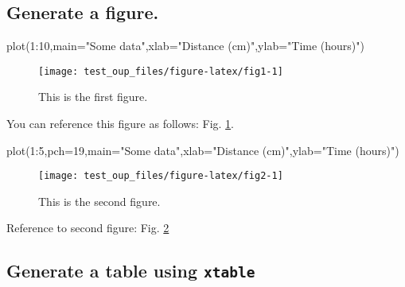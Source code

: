 \documentclass[12pt,halfline,a4paper,]{ouparticle}
\newenvironment{Shaded}{\begin{snugshade}}{\end{snugshade}}
\newcommand{\AttributeTok}[1]{\textcolor[rgb]{0.77,0.63,0.00}{#1}}
\newcommand{\DecValTok}[1]{\textcolor[rgb]{0.00,0.00,0.81}{#1}}
\newcommand{\FunctionTok}[1]{\textcolor[rgb]{0.00,0.00,0.00}{#1}}
\newcommand{\NormalTok}[1]{#1}
\newcommand{\SpecialCharTok}[1]{\textcolor[rgb]{0.00,0.00,0.00}{#1}}
\newcommand{\StringTok}[1]{\textcolor[rgb]{0.31,0.60,0.02}{#1}}
\begin{document}
\hypertarget{generate-a-figure.}{%
\subsection{Generate a figure.}\label{generate-a-figure.}}

\begin{Shaded}
\begin{Highlighting}[]
\FunctionTok{plot}\NormalTok{(}\DecValTok{1}\SpecialCharTok{:}\DecValTok{10}\NormalTok{,}\AttributeTok{main=}\StringTok{"Some data"}\NormalTok{,}\AttributeTok{xlab=}\StringTok{"Distance (cm)"}\NormalTok{,}\AttributeTok{ylab=}\StringTok{"Time (hours)"}\NormalTok{)}
\end{Highlighting}
\end{Shaded}

\begin{figure}[p]
\texttt{[image: test\_oup\_files/figure-latex/fig1-1]} \caption{This is the first figure.}\label{fig:fig1}
\end{figure}

You can reference this figure as follows: Fig. \ref{fig:fig1}.

\begin{Shaded}
\begin{Highlighting}[]
\FunctionTok{plot}\NormalTok{(}\DecValTok{1}\SpecialCharTok{:}\DecValTok{5}\NormalTok{,}\AttributeTok{pch=}\DecValTok{19}\NormalTok{,}\AttributeTok{main=}\StringTok{"Some data"}\NormalTok{,}\AttributeTok{xlab=}\StringTok{"Distance (cm)"}\NormalTok{,}\AttributeTok{ylab=}\StringTok{"Time (hours)"}\NormalTok{)}
\end{Highlighting}
\end{Shaded}

\begin{figure}[p]
\texttt{[image: test\_oup\_files/figure-latex/fig2-1]} \caption{This is the second figure.}\label{fig:fig2}
\end{figure}

Reference to second figure: Fig. \ref{fig:fig2}

\hypertarget{generate-a-table-using-xtable}{%
\subsection{\texorpdfstring{Generate a table using \texttt{xtable}}{Generate a table using xtable}}\label{generate-a-table-using-xtable}}
\end{document}
